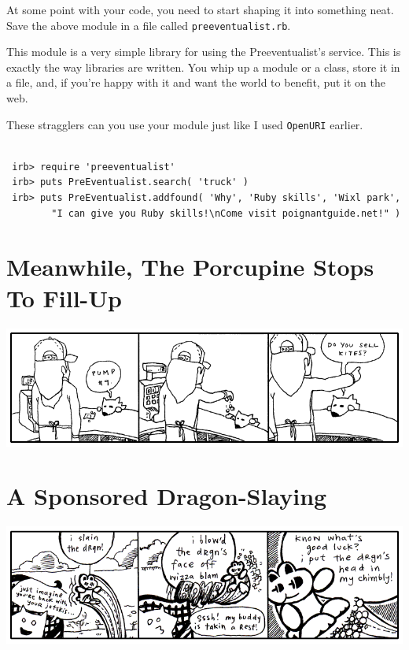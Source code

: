 \documentclass[10pt,twoside]{report}
\begin{document}
At some point with your code, you need to start shaping it into
something neat.  Save the above module in a file called
\lstinline[breaklines=true]|preeventualist.rb|.

This module is a very simple library for using the Preeventualist's
service.  This is exactly the way libraries are written.  You whip up
a module or a class, store it in a file, and, if you're happy with it
and want the world to benefit, put it on the web.

These stragglers can you use your module just like I used
\lstinline[breaklines=true]|OpenURI| earlier.


\begin{lstlisting}

 irb> require 'preeventualist'
 irb> puts PreEventualist.search( 'truck' )
 irb> puts PreEventualist.addfound( 'Why', 'Ruby skills', 'Wixl park',
        "I can give you Ruby skills!\nCome visit poignantguide.net!" )

\end{lstlisting}



\section{Meanwhile, The Porcupine Stops To Fill-Up}


	\includegraphics[width=1.0\textwidth]{cache/60.png}

\newpage


\section{A Sponsored Dragon-Slaying}


	\includegraphics[width=1.0\textwidth]{cache/61.png}
\end{document}
